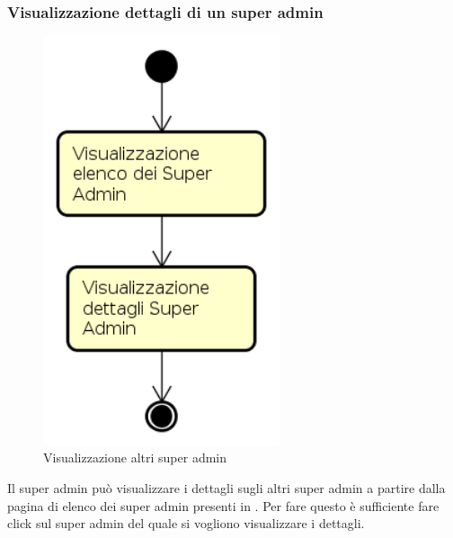 \subsubsection{Visualizzazione dettagli di un super admin}
\begin{figure}[H]
\begin{center}
\includegraphics[height=12cm]{res/sections/backend/activities/visualizzazioneDettagliSuperAdminSA.png}
\caption{Visualizzazione altri super admin}
\end{center}
\end{figure}
Il super admin può visualizzare i dettagli sugli altri super admin a partire dalla pagina di elenco dei super admin presenti in . Per fare questo è sufficiente fare click sul super admin del quale si vogliono visualizzare i dettagli.
